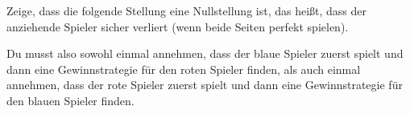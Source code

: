 \documentclass{zirkelbrief1516}
\begin{document}
\begin{aufgabe}
  Zeige, dass die folgende Stellung eine Nullstellung ist, das heißt, dass der anziehende Spieler sicher verliert (wenn beide Seiten perfekt spielen).
\begin{center}
\end{center}
Du musst also sowohl einmal annehmen, dass der blaue Spieler zuerst spielt und dann eine Gewinnstrategie f\"ur den roten Spieler finden, als auch einmal annehmen, dass der rote Spieler zuerst spielt und dann eine Gewinnstrategie f\"ur den blauen Spieler finden. 
\end{aufgabe}
\end{document}
